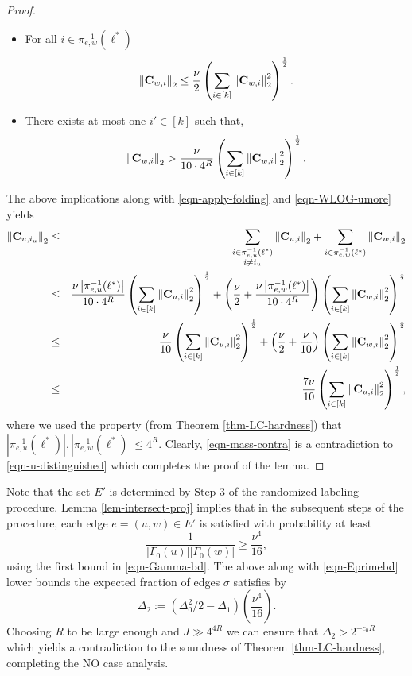 \begin{proof}
\begin{itemize}
\item For all $i \in \pi_{e,w}^{-1}(\ell^*)$
\begin{equation}\label{eqn-projbd-2}
\left\|{\bf C}_{w, i}\right\|_2 \leq \frac{\nu}{2} \left(\sum_{i\in [k]} \left\|{\bf C}_{w, i}\right\|_2^2\right)^{\frac{1}{2}}.
\end{equation}
\item There exists at most one $i' \in [k]$ such that,
\begin{equation}\label{eqn-projbd-3}
\left\|{\bf C}_{w, i}\right\|_2 > \frac{\nu}{10\cdot 4^R} \left(\sum_{i\in [k]} \left\|{\bf C}_{w, i}\right\|_2^2\right)^{\frac{1}{2}}.
\end{equation}
\end{itemize}
The above implications along with \eqref{eqn-apply-folding} and \eqref{eqn-WLOG-umore} yields
\begin{eqnarray}\label{eqn-mass-contra}
\left\|{\bf C}_{u, i_u}\right\|_2 & \leq &  \sum_{\substack{i \in \pi_{e,u}^{-1}(\ell^*)\\ i \neq i_u}} \left\|{\bf C}_{u, i}\right\|_2 + \sum_{i \in \pi_{e,w}^{-1}(\ell^*)}\left\|{\bf C}_{w, i}\right\|_2 \nonumber \\
& \leq & \frac{\nu \left|\pi_{e,u}^{-1}(\ell^*)\right|}{10\cdot 4^R} \left(\sum_{i\in [k]} \left\|{\bf C}_{u, i}\right\|_2^2\right)^{\frac{1}{2}} + 
 \left(\frac{\nu}{2} + \frac{\nu \left|\pi_{e,w}^{-1}(\ell^*)\right|}{10\cdot 4^R}\right) \left(\sum_{i\in [k]} \left\|{\bf C}_{w, i}\right\|_2^2\right)^{\frac{1}{2}} \nonumber \\
& \leq & \frac{\nu}{10}\left(\sum_{i\in [k]} \left\|{\bf C}_{u, i}\right\|_2^2\right)^{\frac{1}{2}} + \left(\frac{\nu}{2} + \frac{\nu}{10}\right) \left(\sum_{i\in [k]} \left\|{\bf C}_{w, i}\right\|_2^2\right)^{\frac{1}{2}} \nonumber \\
& \leq & \frac{7\nu}{10}\left(\sum_{i\in [k]} \left\|{\bf C}_{u, i}\right\|_2^2\right)^{\frac{1}{2}},
\end{eqnarray}
where we used the property (from Theorem \ref{thm-LC-hardness}) that $\left|\pi_{e,u}^{-1}(\ell^*)\right|, \left|\pi_{e,w}^{-1}(\ell^*)\right| \leq 4^R$. Clearly, \eqref{eqn-mass-contra}
 is a contradiction to \eqref{eqn-u-distinguished} which completes the proof of the lemma.
\end{proof}
Note that the set $E'$ is determined by Step 3 of the randomized labeling procedure. Lemma \ref{lem-intersect-proj} implies that in the subsequent steps of the procedure, each edge $e = (u,w) \in E'$ is satisfied with probability at least
$$\frac{1}{\left|\Gamma_0(u)\right|\left|\Gamma_0(w)\right|} \geq \frac{\nu^4}{16},$$
using the first bound in \eqref{eqn-Gamma-bd}. The above along with \eqref{eqn-Eprimebd} lower bounds the expected fraction of edges $\sigma$ satisfies by
$$\Delta_2 := \left(\Delta_0^2/2 - \Delta_1\right)\left(\frac{\nu^4}{16}\right).$$
Choosing $R$ to be large enough and $J \gg 4^{4R}$ we can ensure that $\Delta_2 > 2^{-c_0R}$ which yields a contradiction to the soundness of Theorem \ref{thm-LC-hardness}, completing the NO case analysis.


